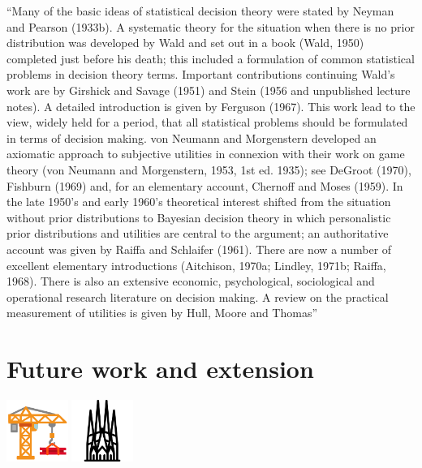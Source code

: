 \documentclass{article}
\theoremstyle{definition}
\begin{document}
``Many of the basic ideas of statistical decision theory were stated by
Neyman and Pearson (1933b). A systematic theory for the situation
when there is no prior distribution was developed by Wald and set out
in a book (Wald, 1950) completed just before his death; this included
a formulation of common statistical problems in decision theory
terms. Important contributions continuing Wald’s work are by
Girshick and Savage (1951) and Stein (1956 and unpublished
lecture notes). A detailed introduction is given by Ferguson (1967).
This work lead to the view, widely held for a period, that all statistical
problems should be formulated in terms of decision making.
von Neumann and Morgenstern developed an axiomatic approach
to subjective utilities in connexion with their work on game theory
(von Neumann and Morgenstern, 1953, 1st ed. 1935); see DeGroot
(1970), Fishburn (1969) and, for an elementary account, Chernoff
and Moses (1959).
In the late 1950’s and early 1960’s theoretical interest shifted from
the situation without prior distributions to Bayesian decision theory
in which personalistic prior distributions and utilities are central to
the argument; an authoritative account was given by Raiffa and
Schlaifer (1961). There are now a number of excellent elementary
introductions (Aitchison, 1970a; Lindley, 1971b; Raiffa, 1968).
There is also an extensive economic, psychological, sociological and
operational research literature on decision making. A review on the
practical measurement of utilities is given by Hull, Moore and Thomas'' \cite{book:CoxStatistics}




\section{Future work and extension}
\label{sec:FutureWork}

\includegraphics[width=0.15\textwidth]{img/logos/Construction.pdf}
\includegraphics[width=0.15\textwidth]{img/logos/SagradaFamilia.pdf}
\end{document}
